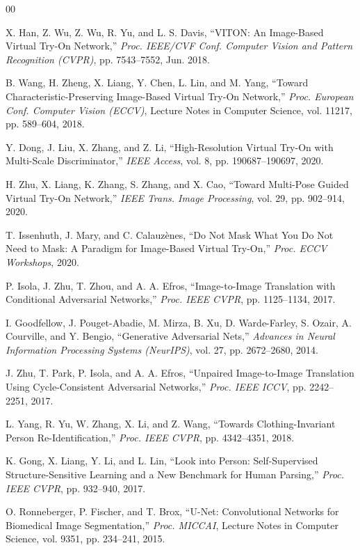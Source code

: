 \documentclass[conference]{IEEEtran}
\begin{document}
\begin{thebibliography}{00}

 X. Han, Z. Wu, Z. Wu, R. Yu, and L. S. Davis, ``VITON: An Image-Based Virtual Try-On Network,'' \textit{Proc. IEEE/CVF Conf. Computer Vision and Pattern Recognition (CVPR)}, pp. 7543--7552, Jun. 2018.

 B. Wang, H. Zheng, X. Liang, Y. Chen, L. Lin, and M. Yang, ``Toward Characteristic-Preserving Image-Based Virtual Try-On Network,'' \textit{Proc. European Conf. Computer Vision (ECCV)}, Lecture Notes in Computer Science, vol. 11217, pp. 589--604, 2018.

 Y. Dong, J. Liu, X. Zhang, and Z. Li, ``High-Resolution Virtual Try-On with Multi-Scale Discriminator,'' \textit{IEEE Access}, vol. 8, pp. 190687--190697, 2020.

 H. Zhu, X. Liang, K. Zhang, S. Zhang, and X. Cao, ``Toward Multi-Pose Guided Virtual Try-On Network,'' \textit{IEEE Trans. Image Processing}, vol. 29, pp. 902--914, 2020.

 T. Issenhuth, J. Mary, and C. Calauz\`{e}nes, ``Do Not Mask What You Do Not Need to Mask: A Paradigm for Image-Based Virtual Try-On,'' \textit{Proc. ECCV Workshops}, 2020.

 P. Isola, J. Zhu, T. Zhou, and A. A. Efros, ``Image-to-Image Translation with Conditional Adversarial Networks,'' \textit{Proc. IEEE CVPR}, pp. 1125--1134, 2017.

 I. Goodfellow, J. Pouget-Abadie, M. Mirza, B. Xu, D. Warde-Farley, S. Ozair, A. Courville, and Y. Bengio, ``Generative Adversarial Nets,'' \textit{Advances in Neural Information Processing Systems (NeurIPS)}, vol. 27, pp. 2672--2680, 2014.

 J. Zhu, T. Park, P. Isola, and A. A. Efros, ``Unpaired Image-to-Image Translation Using Cycle-Consistent Adversarial Networks,'' \textit{Proc. IEEE ICCV}, pp. 2242--2251, 2017.

 L. Yang, R. Yu, W. Zhang, X. Li, and Z. Wang, ``Towards Clothing-Invariant Person Re-Identification,'' \textit{Proc. IEEE CVPR}, pp. 4342--4351, 2018.

 K. Gong, X. Liang, Y. Li, and L. Lin, ``Look into Person: Self-Supervised Structure-Sensitive Learning and a New Benchmark for Human Parsing,'' \textit{Proc. IEEE CVPR}, pp. 932--940, 2017.

 O. Ronneberger, P. Fischer, and T. Brox, ``U-Net: Convolutional Networks for Biomedical Image Segmentation,'' \textit{Proc. MICCAI}, Lecture Notes in Computer Science, vol. 9351, pp. 234--241, 2015.


\end{thebibliography}
\end{document}
